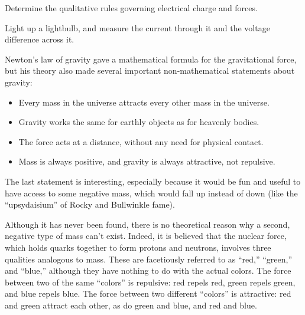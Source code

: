 \label{lab:electricity}

\apparatus
{}

\enlargethispage{-\baselineskip}

\begin{goals}

\item[] Determine the qualitative rules governing electrical charge and forces.

\item[] Light up a lightbulb, and measure the current through it and the voltage difference across it.
\end{goals}

\vspace{10mm}

\introduction

Newton's law of gravity gave a mathematical formula for the
gravitational force, but his theory also made several
important non-mathematical statements about gravity:

\begin{itemize}
\item[] Every mass in the universe attracts every other mass in the universe.

\item[] Gravity works the same for earthly objects as for heavenly bodies.

\item[] The force acts at a distance, without any need for physical contact.

\item[] Mass is always positive, and gravity is always attractive, not repulsive.
\end{itemize}

The last statement is interesting, especially because it
would be fun and useful to have access to some negative
mass, which would fall up instead of down (like the
``upsydaisium'' of Rocky and Bullwinkle fame).

Although it has never been found, there is no theoretical
reason why a second, negative type of mass can't exist. 
Indeed, it is believed that the nuclear force, which holds
quarks together to form protons and neutrons, involves three
qualities analogous to mass. These are facetiously referred
to as ``red,'' ``green,'' and ``blue,'' although they have
nothing to do with the actual colors. The force between two
of the same ``colors'' is repulsive: red repels red, green
repels green, and blue repels blue. The force between two
different ``colors'' is attractive: red and green attract
each other, as do green and blue, and red and blue.

